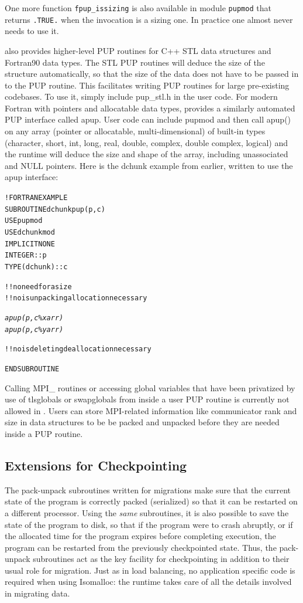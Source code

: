 \documentclass[10pt]{article}
\begin{document}
One more function \verb+fpup_issizing+ is also available in module \texttt{pupmod}
that returns \verb+.TRUE.+ when the invocation is a sizing one. In practice one
almost never needs to use it.

\charmpp{} also provides higher-level PUP routines for C++ STL data structures
and Fortran90 data types. The STL PUP routines will deduce the size of the
structure automatically, so that the size of the data does not have to be passed
in to the PUP routine. This facilitates writing PUP routines for large
pre-existing codebases. To use it, simply include pup\_stl.h in the user code.
For modern Fortran with pointers and allocatable data types, \ampi{} provides a
similarly automated PUP interface called apup. User code can include pupmod and
then call apup() on any array (pointer or allocatable, multi-dimensional) of
built-in types (character, short, int, long, real, double, complex, double
complex, logical) and the runtime will deduce the size and shape of the array,
including unassociated and NULL pointers. Here is the dchunk example from
earlier, written to use the apup interface:

\begin{alltt}
!FORTRAN EXAMPLE
SUBROUTINE dchunkpup(p, c)
  USE pupmod
  USE dchunkmod
  IMPLICIT NONE
  INTEGER :: p
  TYPE(dchunk) :: c

  !! no need for asize
  !! no isunpacking allocation necessary

  \emph{
  apup(p, c\%xarr)
  apup(p, c\%yarr)
  }

  !! no isdeleting deallocation necessary

END SUBROUTINE
\end{alltt}

Calling MPI\_ routines or accessing global variables that have been privatized by use of tlsglobals
or swapglobals from inside a user PUP routine is currently not allowed in \ampi{}.
Users can store MPI-related information like communicator rank and size in data structures to be
be packed and unpacked before they are needed inside a PUP routine.

\subsection{Extensions for Checkpointing}

The pack-unpack subroutines written for migrations make sure that the current
state of the program is correctly packed (serialized) so that it can be
restarted on a different processor. Using the \emph{same} subroutines, it
is also possible to save the state of the program to disk, so that if the
program were to crash abruptly, or if the allocated time for the program
expires before completing execution, the program can be restarted from the
previously checkpointed state. Thus, the pack-unpack subroutines act as the
key facility for checkpointing in addition to their usual role for migration.
Just as in load balancing, no application specific code is required when using
Isomalloc: the \ampi{} runtime takes care of all the details involved in
migrating data.
\end{document}
